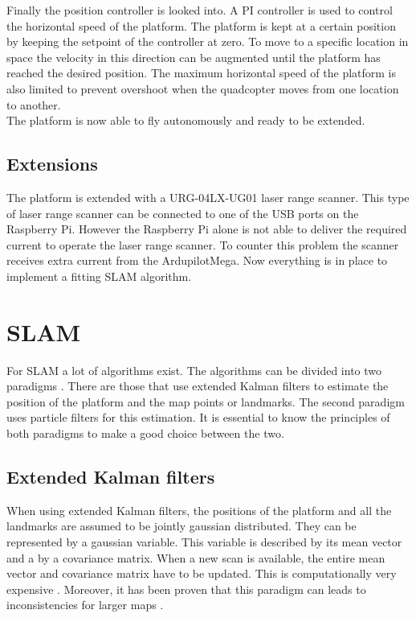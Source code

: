 \documentclass[twocolumn]{phdsymp} %
\begin{document}
Finally the position controller is looked into. A PI controller is used to control the horizontal speed of the platform. The platform is kept at a certain position by keeping the setpoint of the controller at zero. To move to a specific location in space the velocity in this direction can be augmented until the platform has reached the desired position. The maximum horizontal speed of the platform is also limited to prevent overshoot when the quadcopter moves from one location to another.\\
The platform is now able to fly autonomously and ready to be extended.

\subsection{Extensions}
The platform is extended with a URG-04LX-UG01 laser range scanner. This type of laser range scanner can be connected to one of the USB ports on the Raspberry Pi. However the Raspberry Pi alone is not able to deliver the required current to operate the laser range scanner. To counter this problem the scanner receives extra current from the ArdupilotMega. Now everything is in place to implement a fitting SLAM algorithm.

\section{SLAM}
For SLAM a lot of algorithms exist. The algorithms can be divided into two paradigms \cite{book:SLAMHandbook}. There are those that use extended Kalman filters to estimate the position of the platform and the map points or landmarks. The second paradigm uses particle filters for this estimation. It is essential to know the principles of both paradigms to make a good choice between the two.

\subsection{Extended Kalman filters}
When using extended Kalman filters, the positions of the platform and all the landmarks are assumed to be jointly gaussian distributed. They can be represented by a gaussian variable. This variable is described by its mean vector and a by a covariance matrix. When a new scan is available, the entire mean vector and covariance matrix have to be updated. This is computationally very expensive \cite{paper:FastSLAM}. Moreover, it has been proven that this paradigm can leads to inconsistencies for larger maps \cite{paper:SLAMconsistency}.
\end{document}
